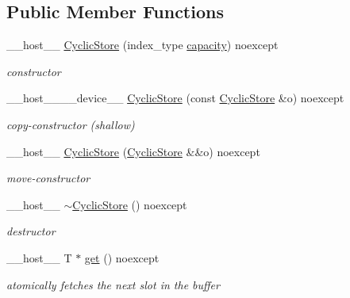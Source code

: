 \subsection*{Public Member Functions}
\begin{DoxyCompactItemize}
\item 
\+\_\+\+\_\+host\+\_\+\+\_\+ \hyperlink{classwarpcore_1_1storage_1_1CyclicStore_a90547b0e8e7f2d2bf4ca54ecbebeff6c}{Cyclic\+Store} (index\+\_\+type \hyperlink{classwarpcore_1_1storage_1_1CyclicStore_acc4bfbb9b10868a193301d0ec5a46711}{capacity}) noexcept
\begin{DoxyCompactList}\small\item\em constructor \end{DoxyCompactList}\item 
\+\_\+\+\_\+host\+\_\+\+\_\+\+\_\+\+\_\+device\+\_\+\+\_\+ \hyperlink{classwarpcore_1_1storage_1_1CyclicStore_a8c9f9193f3a45063b9b73fece142aa81}{Cyclic\+Store} (const \hyperlink{classwarpcore_1_1storage_1_1CyclicStore}{Cyclic\+Store} \&o) noexcept
\begin{DoxyCompactList}\small\item\em copy-\/constructor (shallow) \end{DoxyCompactList}\item 
\+\_\+\+\_\+host\+\_\+\+\_\+ \hyperlink{classwarpcore_1_1storage_1_1CyclicStore_a5657f1b2e0f9f7c8ee0de28d2c305cf0}{Cyclic\+Store} (\hyperlink{classwarpcore_1_1storage_1_1CyclicStore}{Cyclic\+Store} \&\&o) noexcept
\begin{DoxyCompactList}\small\item\em move-\/constructor \end{DoxyCompactList}\item 
\mbox{\label{classwarpcore_1_1storage_1_1CyclicStore_a4ccee1383c1d6434c49fae48a1e6c9c0}} 
\+\_\+\+\_\+host\+\_\+\+\_\+ \hyperlink{classwarpcore_1_1storage_1_1CyclicStore_a4ccee1383c1d6434c49fae48a1e6c9c0}{$\sim$\+Cyclic\+Store} () noexcept
\begin{DoxyCompactList}\small\item\em destructor \end{DoxyCompactList}\item 
\+\_\+\+\_\+host\+\_\+\+\_\+ T $\ast$ \hyperlink{classwarpcore_1_1storage_1_1CyclicStore_afa6513c27f8e27b256b45d992ba4c820}{get} () noexcept
\begin{DoxyCompactList}\small\item\em atomically fetches the next slot in the buffer \end{DoxyCompactList}\item 

\end{DoxyCompactItemize}
